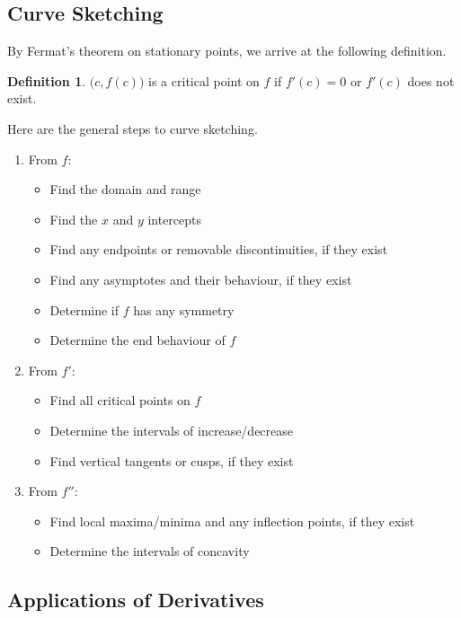 \documentclass[11pt]{scrartcl}
\theoremstyle{plain}
\theoremstyle{definition}
\newtheorem*{definition}{Definition}
\theoremstyle{remark}
\begin{document}
\subsection{Curve Sketching}

By Fermat's theorem on stationary points, we arrive at the following definition.

\begin{definition}
    $\bigl(c,f(c)\bigr)$ is a critical point on $f$ if $f'(c)=0$ or $f'(c)$ does not exist.
\end{definition}

Here are the general steps to curve sketching.

\begin{enumerate}
    \item From $f$:
    \begin{itemize}
        \item Find the domain and range 
        \item Find the $x$ and $y$ intercepts
        \item Find any endpoints or removable discontinuities, if they exist
        \item Find any asymptotes and their behaviour, if they exist
        \item Determine if $f$ has any symmetry
        \item Determine the end behaviour of $f$
    \end{itemize}
    \item From $f'$: 
    \begin{itemize}
        \item Find all critical points on $f$
        \item Determine the intervals of increase/decrease
        \item Find vertical tangents or cusps, if they exist
    \end{itemize}
    \item From $f''$: 
    \begin{itemize}
        \item Find local maxima/minima and any inflection points, if they exist
        \item Determine the intervals of concavity
    \end{itemize}
\end{enumerate}

\subsection{Applications of Derivatives}
\end{document}
